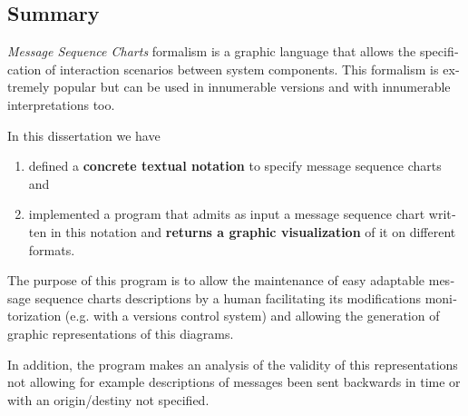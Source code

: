 \begin{otherlanguage}{english}

\chapter*{Summary}

\emph{Message Sequence Charts} formalism  is
a graphic language that allows the specification of interaction
scenarios between system components. This formalism is extremely popular but can be used in
innumerable versions and with innumerable interpretations too.

In this dissertation  we have
\begin{enumerate}
\item defined a \textbf{concrete textual notation} to specify message
  sequence charts and
\item implemented a program that admits as input a message sequence
  chart written in this notation and \textbf{returns a graphic
  visualization} of it on different formats.
\end{enumerate}

The purpose of this program is to allow the maintenance of easy
adaptable message sequence charts descriptions by a human facilitating
its modifications monitorization (e.g. with a versions control system)
and allowing the generation of graphic representations of this
diagrams.

In addition, the program makes an analysis of the validity of this
representations not allowing for example descriptions of messages been
sent backwards in time or with an origin/destiny not specified.


\end{otherlanguage}

